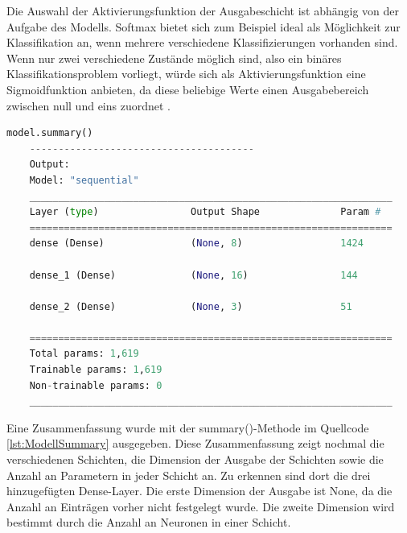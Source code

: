 Die Auswahl der Aktivierungsfunktion der Ausgabeschicht ist abhängig von der Aufgabe des Modells. 
\glqq Softmax\grqq{} bietet sich zum Beispiel ideal als Möglichkeit zur Klassifikation an, wenn mehrere verschiedene Klassifizierungen vorhanden sind. Wenn nur zwei verschiedene Zustände möglich sind, 
also ein binäres Klassifikationsproblem vorliegt, würde sich als Aktivierungsfunktion eine Sigmoidfunktion anbieten, da diese beliebige Werte einen Ausgabebereich zwischen null und eins 
zuordnet \cite[vgl. S.100]{DL_PY}.

\begin{lstlisting}[language = python, caption={Zusammenfassung des Modells},captionpos=b, label = lst:ModellSummary, float, floatplacement=H]
    model.summary()
    ---------------------------------------
    Output:
    Model: "sequential"
    _______________________________________________________________
    Layer (type)                Output Shape              Param #   
    ===============================================================
    dense (Dense)               (None, 8)                 1424      
                                                                    
    dense_1 (Dense)             (None, 16)                144       
                                                                    
    dense_2 (Dense)             (None, 3)                 51        
                                                                    
    ===============================================================
    Total params: 1,619
    Trainable params: 1,619
    Non-trainable params: 0
    _______________________________________________________________
\end{lstlisting}
Eine Zusammenfassung wurde mit der summary()-Methode im Quellcode \ref{lst:ModellSummary} ausgegeben. 
Diese Zusammenfassung zeigt nochmal die verschiedenen Schichten, die Dimension der Ausgabe der Schichten sowie die Anzahl an Parametern in jeder Schicht an. 
Zu erkennen sind dort die drei hinzugefügten Dense-Layer. Die erste Dimension der Ausgabe ist \glqq None\grqq{}, da die Anzahl an Einträgen vorher nicht festgelegt wurde. 
Die zweite Dimension wird bestimmt durch die Anzahl an Neuronen in einer Schicht.\\

